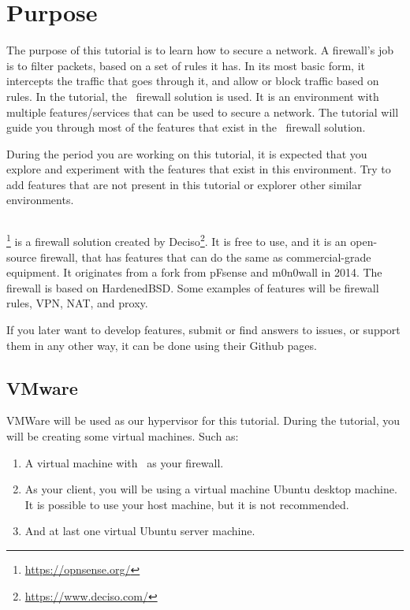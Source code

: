 \pagestyle{fancy}
\section*{Purpose}
The purpose of this tutorial is to learn how to secure a network. A firewall's job is to filter packets, based on a set of rules it has. In its most basic form, it intercepts the traffic that goes through it, and allow or block traffic based on rules. In the tutorial, the \opnsense\ firewall solution is used. It is an environment with multiple features/services that can be used to secure a network. The tutorial will guide you through most of the features that exist in the \opnsense\ firewall solution. 

During the period you are working on this tutorial, it is expected that you explore and experiment with the features that exist in this environment. Try to add features that are not present in this tutorial or explorer other similar environments.

\subsection*{\opnsense}

\opnsense\footnote{\url{https://opnsense.org/}} is a firewall solution created by Deciso\footnote{\url{https://www.deciso.com/}}. It is free to use, and it is an open-source firewall, that has features that can do the same as commercial-grade equipment. It originates from a fork from pFsense and m0n0wall in 2014. The firewall is based on HardenedBSD. Some examples of features will be firewall rules, VPN, NAT, and proxy.

If you later want to develop features, submit or find answers to issues, or support them in any other way, it can be done using their Github pages.


\subsection*{VMware}
VMWare will be used as our hypervisor for this tutorial. During the tutorial, you will be creating some virtual machines. Such as:

\begin{enumerate}
    \item A virtual machine with \opnsense\ as your firewall.
    \item As your client, you will be using a virtual machine Ubuntu desktop machine. It is possible to use your host machine, but it is not recommended.
    \item And at last one virtual Ubuntu server machine.
\end{enumerate}

